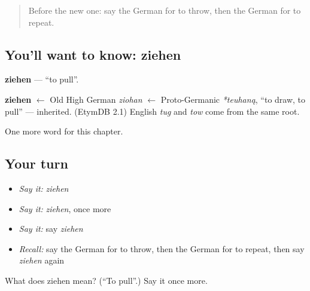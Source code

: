 \begin{quote}
Before the new one: say the German for to throw, then the German for to repeat.
\end{quote}

\subsection*{You'll want to know: ziehen}
\textbf{ziehen} — \textquotedblleft{}to pull\textquotedblright{}.

\begin{cousinweb}
\textbf{ziehen} $\leftarrow$ Old High German \emph{ziohan} $\leftarrow$ Proto-Germanic \emph{*teuhaną}, \textquotedblleft{}to draw, to pull\textquotedblright{} — inherited. (EtymDB 2.1) English \emph{tug} and \emph{tow} come from the same root.
\end{cousinweb}

\begin{grammarlens}[title={What you've built}]
One more word for this chapter.
\end{grammarlens}

\subsection*{Your turn}
\begin{itemize}
\raggedright
  \item \emph{Say it:} \emph{ziehen}
  \item \emph{Say it:} \emph{ziehen}, once more
  \item \emph{Say it:} say \emph{ziehen}
  \item \emph{Recall:} say the German for to throw, then the German for to repeat, then say \emph{ziehen} again
\end{itemize}

\begin{tcolorbox}[breakable,colback=teal!4,colframe=teal!35!black,title={Before you move on}]
What does ziehen mean? (\textquotedblleft{}To pull\textquotedblright{}.) Say it once more.
\end{tcolorbox}
